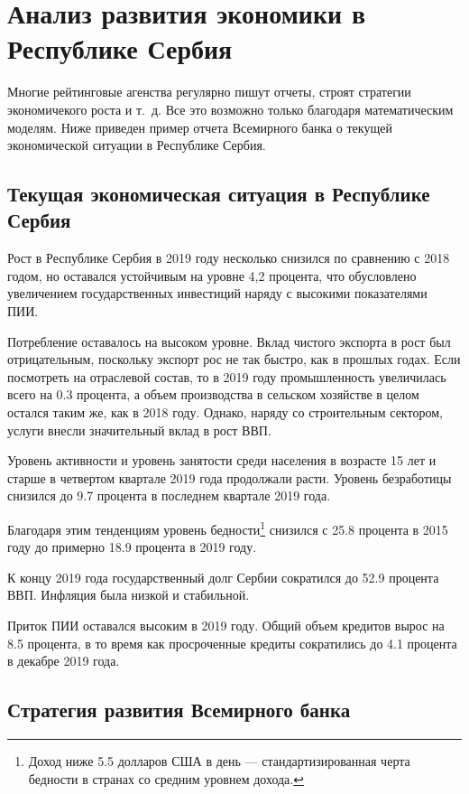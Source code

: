 \chapter{Анализ развития экономики в Республике Сербия}
\label{cha:analys}

Многие рейтинговые агенства регулярно пишут отчеты, строят стратегии экономичекого роста и т.~д.
Все это возможно только благодаря математическим моделям.
Ниже приведен пример отчета Всемирного банка о текущей экономической ситуации в Республике Сербия.

\section{Текущая экономическая ситуация в Республике Сербия}

Рост в Республике Сербия в 2019 году несколько снизился по сравнению с 2018 годом, но оставался устойчивым на уровне 4,2 процента, что обусловлено увеличением государственных инвестиций наряду с высокими показателями ПИИ.

Потребление оставалось на высоком уровне.
Вклад чистого экспорта в рост был отрицательным, поскольку экспорт рос не так быстро, как в прошлых годах.
Если посмотреть на отраслевой состав, то в 2019 году промышленность увеличилась всего на 0.3 процента, а объем производства в сельском хозяйстве в целом остался таким же, как в 2018 году.
Однако, наряду со строительным сектором, услуги внесли значительный вклад в рост ВВП.

Уровень активности и уровень занятости среди населения в возрасте 15 лет и старше в четвертом квартале 2019 года продолжали расти.
Уровень безработицы снизился до 9.7 процента в последнем квартале 2019 года.

Благодаря этим тенденциям уровень бедности\footnote{Доход ниже 5.5 долларов США в день --- стандартизированная черта бедности в странах со средним уровнем дохода.} снизился с 25.8 процента в 2015 году до примерно 18.9 процента в 2019 году.

К концу 2019 года государственный долг Сербии сократился до 52.9 процента ВВП.
Инфляция была низкой и стабильной.

Приток ПИИ оставался высоким в 2019 году.
Общий объем кредитов вырос на 8.5 процента, в то время как просроченные кредиты сократились до 4.1 процента в декабре 2019 года.

\section{Стратегия развития Всемирного банка}

